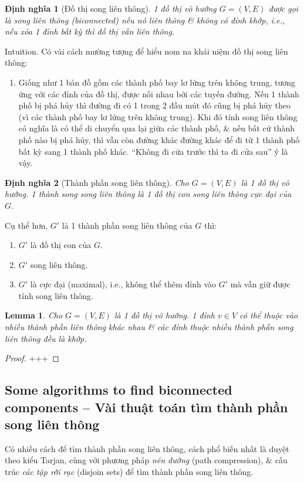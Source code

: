 \documentclass{article}
\newtheorem{dinhnghia}{Định nghĩa}
\newtheorem{lemma}{Lemma}
\begin{document}
\begin{dinhnghia}[Đồ thị song liên thông]
    1 đồ thị vô hướng $G = (V,E)$ được gọi là {\rm song liên thông (biconnected)} nếu nó liên thông \& không có đỉnh khớp, i.e., nếu xóa 1 đỉnh bất kỳ thì đồ thị vẫn liên thông.
\end{dinhnghia}
{\sf Intuition.} Có vài cách mường tượng để hiểu nom na khái niệm đồ thị song liên thông:
\begin{enumerate}
    \item Giống như 1 bản đồ gồm các thành phố bay lơ lửng trên không trung, tương ứng với các đỉnh của đồ thị, được nối nhau bởi các tuyến đường. Nếu 1 thành phố bị phá hủy thì đường đi có 1 trong 2 đầu mút đó cũng bị phá hủy theo (vì các thành phố bay lơ lửng trên không trung). Khi đó tính song liên thông có nghĩa là có thể di chuyển qua lại giữa các thành phố, \& nếu bất cứ thành phố nào bị phá hủy, thì vẫn còn đường khác đường khác để đi từ 1 thành phố bất kỳ sang 1 thành phố khác. ``Không đi cửa trước thì ta đi cửa sau'' ý là vậy.
\end{enumerate}

\begin{dinhnghia}[Thành phần song liên thông]
    Cho $G = (V,E)$ là 1 đồ thị vô hướng. 1 {\rm thành song song liên thông} là 1 đồ thị con song liên thông cực đại của $G$.
\end{dinhnghia}
Cụ thể hơn, $G'$ là 1 thành phần song liên thông của $G$ thì:
\begin{enumerate}
    \item $G'$ là đồ thị con của $G$.
    \item $G'$ song liên thông.
    \item $G'$ là cực đại (maximal), i.e., không thể thêm đỉnh vào $G'$ mà vẫn giữ được tính song liên thông.
\end{enumerate}

\begin{lemma}
    Cho $G = (V,E)$ là 1 đồ thị vô hướng. 1 đỉnh $v\in V$ có thể thuộc vào nhiều thành phần liên thông khác nhau \& các đỉnh thuộc nhiều thành phần song liên thông đều là khớp.
\end{lemma}

\begin{proof}
    +++
\end{proof}


\subsection{Some algorithms to find biconnected components -- Vài thuật toán tìm thành phần song liên thông}
Có nhiều cách để tìm thành phần song liên thông, cách phổ biến nhất là duyệt theo kiểu Tarjan, cùng với phương pháp {\it nén đường} (path compression), \& cấu trúc {\it các tập rời rạc} (disjoin sets) để tìm thành phần song liên thông.
\end{document}
